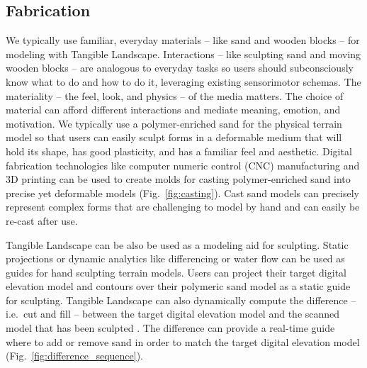\documentclass[prodmode,acmtochi]{acmsmall} %
\begin{document}
\subsection{Fabrication}
We typically use familiar, everyday materials 
-- like sand and wooden blocks -- 
for modeling with Tangible Landscape. 
Interactions -- like sculpting sand and moving wooden blocks -- 
are analogous to everyday tasks
so users should subconsciously know what to do and how to do it, 
leveraging existing sensorimotor schemas. 
The materiality -- the feel, look, and physics -- of the media matters. 
The choice of material can afford different interactions
and mediate meaning, emotion, and motivation. 
We typically use a polymer-enriched sand for the physical terrain model
so that users can easily sculpt forms in a deformable medium 
that will hold its shape, has good plasticity, and has a familiar feel and aesthetic. 
Digital fabrication technologies 
like computer numeric control (CNC) manufacturing and 3D printing
can be used to create molds for casting polymer-enriched sand 
into precise yet deformable models (Fig.~\ref{fig:casting}). 
Cast sand models can precisely represent complex forms 
that are challenging to model by hand 
and can easily be re-cast after use.

Tangible Landscape can be also be used as a modeling aid for sculpting.
Static projections or dynamic analytics like differencing or water flow 
can be used as guides for hand sculpting terrain models. 
Users can project their target digital elevation model and contours 
over their polymeric sand model as a static guide for sculpting. 
Tangible Landscape can also dynamically compute the difference -- i.e.\ cut and fill --
between the target digital elevation model and the scanned model that has been sculpted . 
The difference can provide a real-time guide 
where to add or remove sand in order to match the target digital elevation model (Fig.~\ref{fig:difference_sequence}). 
\end{document}
